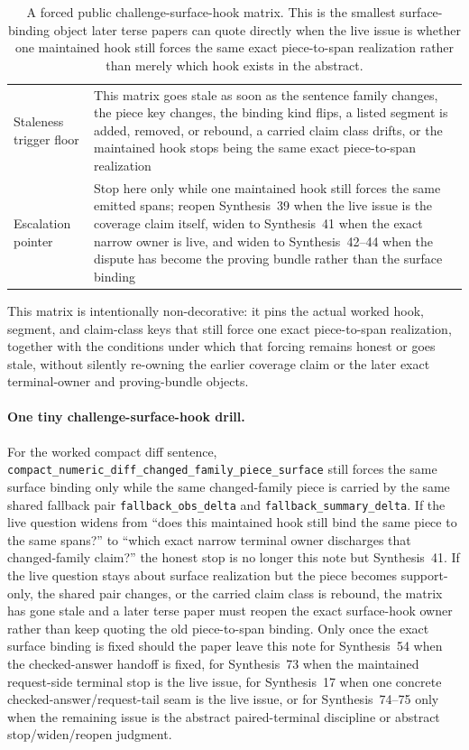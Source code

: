 \documentclass[11pt]{article}
\begin{document}
\begin{table}[t]
\begin{tabularx}{\linewidth}{@{}lX@{}}
Staleness trigger floor & This matrix goes stale as soon as the sentence family changes, the piece key changes, the binding kind flips, a listed segment is added, removed, or rebound, a carried claim class drifts, or the maintained hook stops being the same exact piece-to-span realization \\
Escalation pointer & Stop here only while one maintained hook still forces the same emitted spans; reopen Synthesis~39 when the live issue is the coverage claim itself, widen to Synthesis~41 when the exact narrow owner is live, and widen to Synthesis~42--44 when the dispute has become the proving bundle rather than the surface binding \\
\bottomrule
\end{tabularx}
\caption{A forced public challenge-surface-hook matrix. This is the smallest surface-binding object later terse papers can quote directly when the live issue is whether one maintained hook still forces the same exact piece-to-span realization rather than merely which hook exists in the abstract.}
\label{tab:forced-public-challenge-surface-hook-matrix}
\end{table}

This matrix is intentionally non-decorative: it pins the actual worked hook, segment, and claim-class keys that still force one exact piece-to-span realization, together with the conditions under which that forcing remains honest or goes stale, without silently re-owning the earlier coverage claim or the later exact terminal-owner and proving-bundle objects.\cite{series:workedexample}

\paragraph{One tiny challenge-surface-hook drill.}
For the worked compact diff sentence, \nolinkurl{compact_numeric_diff_changed_family_piece_surface} still forces the same surface binding only while the same changed-family piece is carried by the same shared fallback pair \nolinkurl{fallback_obs_delta} and \nolinkurl{fallback_summary_delta}. If the live question widens from ``does this maintained hook still bind the same piece to the same spans?'' to ``which exact narrow terminal owner discharges that changed-family claim?'' the honest stop is no longer this note but Synthesis~41. If the live question stays about surface realization but the piece becomes support-only, the shared pair changes, or the carried claim class is rebound, the matrix has gone stale and a later terse paper must reopen the exact surface-hook owner rather than keep quoting the old piece-to-span binding. Only once the exact surface binding is fixed should the paper leave this note for Synthesis~54 when the checked-answer handoff is fixed, for Synthesis~73 when the maintained request-side terminal stop is the live issue, for Synthesis~17 when one concrete checked-answer/request-tail seam is the live issue, or for Synthesis~74--75 only when the remaining issue is the abstract paired-terminal discipline or abstract stop/widen/reopen judgment.\cite{series:workedexample}
\end{document}
